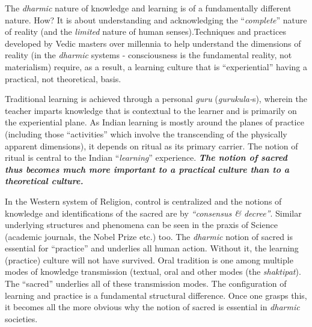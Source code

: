 The \textit{dharmic} nature of knowledge and learning is of a fundamentally different nature. How? It is about understanding and acknowledging the “\textit{complete}” nature of reality (and the \textit{limited} nature of human senses).Techniques and practices developed by Vedic masters over millennia to help understand the dimensions of reality (in the \textit{dharmic} systems - consciousness is the fundamental reality, not materialism) require, as a result, a learning culture that is “experiential” having a practical, not theoretical, basis. 

Traditional learning is achieved through a personal \textit{guru} (\textit{gurukula-}s), wherein the teacher imparts knowledge that is contextual to the learner and is primarily on the experiential plane. As Indian learning is mostly around the planes of practice (including those “activities” which involve the transcending of the physically apparent dimensions), it depends on ritual as its primary carrier. The notion of ritual is central to the Indian “\textit{learning}” experience. \textbf{\textit{The notion of sacred thus becomes much more important to a practical culture than to a theoretical culture.}}

In the Western system of Religion, control is centralized and the notions of knowledge and identifications of the sacred are by \textit{“consensus \& decree”}. Similar underlying structures and phenomena can be seen in the praxis of Science (academic journals, the Nobel Prize etc.) too. The \textit{dharmic} notion of sacred is essential for “practice” and underlies all human action. Without it, the learning (practice) culture will not have survived. Oral tradition is one among multiple modes of knowledge transmission (textual, oral and other modes (the \textit{shaktipat}). The “sacred” underlies all of these transmission modes. The configuration of learning and practice is a fundamental structural difference. Once one grasps this, it becomes all the more obvious why the notion of sacred is essential in \textit{dharmic} societies. 

